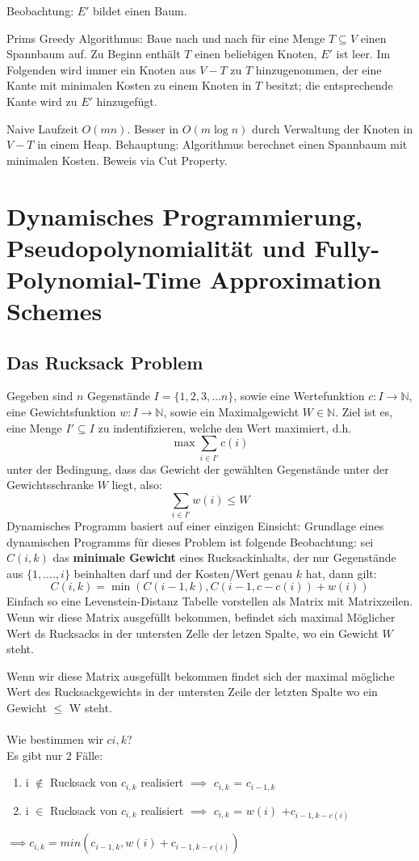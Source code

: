 \documentclass{article}
\begin{document}
Beobachtung: $E'$ bildet einen Baum.

Prims Greedy Algorithmus: Baue nach und nach für eine Menge $T\subseteq V$ einen Spannbaum auf. Zu Beginn enthält $T$ einen beliebigen Knoten, $E'$ ist leer. Im Folgenden wird immer ein Knoten aus $V-T$ zu $T$ hinzugenommen, der eine Kante mit minimalen Kosten zu einem Knoten in $T$ besitzt; die entsprechende Kante wird zu $E'$ hinzugefügt.

Naive Laufzeit $O(mn)$. Besser in $O(m\log n)$ durch Verwaltung der Knoten in $V-T$ in einem Heap.
Behauptung: Algorithmus berechnet einen Spannbaum mit minimalen Kosten. Beweis via Cut Property.
\section{Dynamisches Programmierung, Pseudopolynomialität und Fully-Polynomial-Time Approximation Schemes}

\subsection{Das Rucksack Problem}

Gegeben sind $n$ Gegenstände $I=\{1, 2, 3, \dots n \}$, sowie eine Wertefunktion $c:I \rightarrow \mathbb{N}$, eine Gewichtsfunktion $w: I\rightarrow \mathbb{N}$, sowie ein Maximalgewicht $W\in \mathbb{N}$. 
Ziel ist es, eine Menge $I'\subseteq I$ zu indentifizieren, welche den Wert maximiert, d.h.  
\[ 
\max \sum_{i \in I'} c(i)
\]
unter der Bedingung, dass das Gewicht der gewählten Gegenstände unter der Gewichtsschranke $W$ liegt, also: 
\[
	\sum_{i \in I'} w(i) \leq W
\]
Dynamisches Programm basiert auf einer einzigen Einsicht:
Grundlage eines dynamischen Programms für dieses Problem ist folgende Beobachtung: sei $C(i,k)$ das \textbf{minimale Gewicht} eines Rucksackinhalts, der nur Gegenstände aus $\{1,....,i\}$  beinhalten darf und der Kosten/Wert genau $k$ hat, dann gilt: 
\[
	C(i,k)=\min (C(i-1,k), C(i-1,c-c(i))+w(i))
\]\newline
Einfach so eine Levenstein-Distanz Tabelle vorstellen als Matrix mit Matrixzeilen.
Wenn wir diese Matrix ausgefüllt bekommen, befindet sich maximal Möglicher Wert ds Rucksacks in der untersten Zelle der letzen Spalte, wo ein Gewicht \leq $W$ steht. \newline

Wenn wir diese Matrix ausgefüllt bekommen findet sich der maximal mögliche Wert des Rucksackgewichts in der untersten Zeile der letzten Spalte wo ein Gewicht
$\leq$ W steht.\\
\\
Wie bestimmen wir $c{i,k}$?\\
Es gibt nur 2 Fälle:\\
\begin{enumerate} 
	\item i $\notin$ Rucksack von $c_{i,k}$ realisiert $\implies$ $c_{i,k}$  = $c_{i-1,k}$ 
	\item i $\in$ Rucksack  von $c_{i,k}$ realisiert $\implies$  $c_{i,k}$  = $ w(i) $ +$c_{i-1,k-c(i)}$ 
\end{enumerate}
$\implies c_{i,k} = min(c_{i-1, k},  w(i)+c_{i-1, k-c(i)}) $ \\
\end{document}
